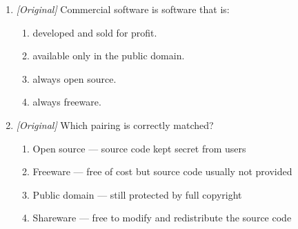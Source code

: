 \begin{enumerate}[label=\textbf{Q\arabic*.}, leftmargin=*]
  \begin{enumerate}[label=\Alph*.]
    \item free of cost forever, with its source code provided.
    \item distributed as a free trial that requires payment to continue.
    \item free to modify and share by anyone.
    \item free of copyright and all restrictions.
  \end{enumerate}
\item \textit{[Original]} Commercial software is software that is:
  \begin{enumerate}[label=\Alph*.]
    \item developed and sold for profit.
    \item available only in the public domain.
    \item always open source.
    \item always freeware.
  \end{enumerate}
\item \textit{[Original]} Which pairing is correctly matched?
  \begin{enumerate}[label=\Alph*.]
    \item Open source --- source code kept secret from users
    \item Freeware --- free of cost but source code usually not provided
    \item Public domain --- still protected by full copyright
    \item Shareware --- free to modify and redistribute the source code
  \end{enumerate}


\end{enumerate}
